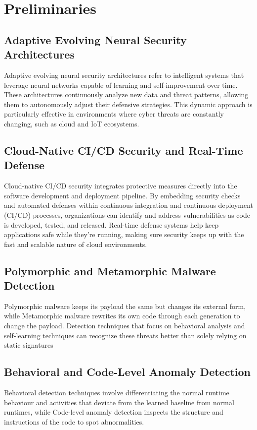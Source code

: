 \section{Preliminaries}
\subsection{Adaptive Evolving Neural Security Architectures}
Adaptive evolving neural security architectures refer to intelligent systems that leverage neural networks capable of learning and self-improvement over time. These architectures continuously analyze new data and threat patterns, allowing them to autonomously adjust their defensive strategies. This dynamic approach is particularly effective in environments where cyber threats are constantly changing, such as cloud and IoT ecosystems.

\subsection{Cloud-Native CI/CD Security and Real-Time Defense}
Cloud-native CI/CD security integrates protective measures directly into the software development and deployment pipeline. By embedding security checks and automated defenses within continuous integration and continuous deployment (CI/CD) processes, organizations can identify and address vulnerabilities as code is developed, tested, and released. Real-time defense systems help keep applications safe while they’re running, making sure security keeps up with the fast and scalable nature of cloud environments.

\subsection{Polymorphic and Metamorphic Malware Detection}
Polymorphic malware keeps its payload the same but changes its external form, while Metamorphic malware rewrites its own code through each generation to change the payload. Detection techniques that focus on behavioral analysis and self-learning techniques can recognize these threats better than solely relying on static signatures

\subsection{Behavioral and Code-Level Anomaly Detection}
Behavioral detection techniques involve differentiating the normal runtime behaviour and activities that deviate from the learned baseline from normal runtimes, while Code-level anomaly detection inspects the structure and instructions of the code to spot abnormalities.


